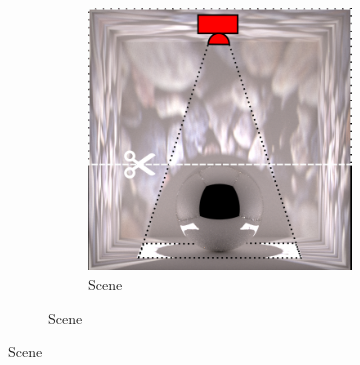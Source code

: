 \begin{figure}[]
    \centering    
    \begin{subfigure}{\textwidth}
        \centering
        \begin{subfigure}{0.5\textwidth}
            \centering
            \includegraphics[width=\textwidth]{images/04-experiment03/ball_dof/scene.jpg}
            \caption{Scene}
            \label{fig:ex03-ball_dof-scene}
        \end{subfigure}


\end{subfigure}
\end{figure}
